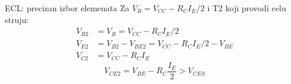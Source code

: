 \begin{frame}[label=10-s088]{ECL: precizan izbor elemenata}
\setlength{\abovedisplayskip}{4pt}\setlength{\belowdisplayskip}{4pt}\setlength{\abovedisplayshortskip}{3pt}\setlength{\belowdisplayshortskip}{3pt}
Za $V_R=V_{CC}-R_CI_E/2$ i T2 koji provodi celu struju:
\[\begin{aligned}V_{B2}&=V_R=V_{CC}-R_CI_E/2\\V_{E2}&=V_{B2}-V_{BE2}=V_{CC}-R_CI_E/2-V_{BE}\\V_{C2}&=V_{CC}-R_CI_E\end{aligned}\]
\bigskip{}
\[V_{CE2}=V_{BE}-R_C\frac{I_E}2>V_{CES}\]
\end{frame}

